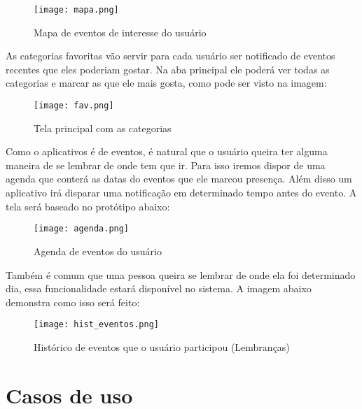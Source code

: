 \documentclass{article}
\begin{document}
				\begin{figure}[H]
				\begin{center}
				\texttt{[image: mapa.png]}
				\end{center}
				\caption{Mapa de eventos de interesse do usuário}
				\end{figure}				
				
				As categorias favoritas vão servir para cada usuário ser notificado de eventos recentes que eles poderiam gostar. Na aba principal ele poderá ver todas as categorias e marcar as que ele mais gosta, como pode ser visto na imagem: 
				
				\begin{figure}[H]
				\begin{center}
				\texttt{[image: fav.png]}
				\end{center}
				\caption{Tela principal com as categorias}
				\end{figure}
				
				Como o aplicativos é de eventos,  é natural que o usuário queira ter alguma maneira de se lembrar de onde tem que ir. Para isso iremos dispor de uma agenda que conterá as datas do eventos que ele marcou presença. Além disso um aplicativo irá disparar uma notificação em determinado tempo antes do evento. A tela será baseado no protótipo abaixo:
				
				\begin{figure}[H]
				\begin{center}
				\texttt{[image: agenda.png]}
				\end{center}
				\caption{Agenda de eventos do usuário}
				\end{figure}
				
				
				
				Também é comum que uma pessoa queira se lembrar de onde ela foi determinado dia, essa funcionalidade estará disponível no sistema. A imagem abaixo demonstra como isso será feito:
				
				\begin{figure}[H]
				\begin{center}
				\texttt{[image: hist\_eventos.png]}
				\end{center}
				\caption{Histórico de eventos que o usuário participou (Lembranças)}
				\end{figure}
				 
				\section{Casos de uso} \bigskip
			
\end{document}
